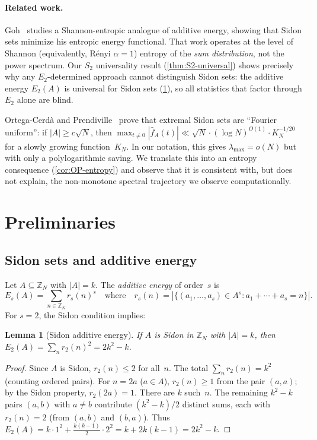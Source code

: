 \documentclass[11pt]{article}
\newtheorem{lemma}[theorem]{Lemma}
\theoremstyle{definition}
\theoremstyle{remark}
\newcommand{\Z}{\mathbb{Z}}
\newcommand{\fhat}{\widehat{f}}
\newcommand{\lmax}{\lambda_{\max}}
\begin{document}
\paragraph{Related work.}
Goh~\cite{Goh2024} studies a Shannon-entropic analogue of additive
energy, showing that Sidon sets minimize his entropic energy functional.
That work operates at the level of Shannon (equivalently, R\'enyi
$\alpha = 1$) entropy of the \emph{sum distribution}, not the power
spectrum.  Our $S_2$ universality result (\cref{thm:S2-universal})
shows precisely why any $E_2$-determined approach cannot distinguish
Sidon sets: the additive energy $E_2(A)$ is universal for Sidon sets
(\cref{lem:sidon-energy}), so all statistics that factor through
$E_2$ alone are blind.

Ortega-Cerd\`a and Prendiville~\cite{OP2021} prove that extremal Sidon
sets are ``Fourier uniform'': if $|A| \ge c\sqrt{N}$, then
$\max_{t \ne 0} |\fhat_A(t)| \ll
\sqrt{N} \cdot (\log N)^{O(1)} \cdot K_N^{-1/20}$
for a slowly growing function~$K_N$.  In our notation, this gives
$\lmax = o(N)$ but with only a polylogarithmic saving.  We translate
this into an entropy consequence (\cref{cor:OP-entropy}) and observe
that it is consistent with, but does not explain, the non-monotone
spectral trajectory we observe computationally.

\section{Preliminaries}\label{sec:prelim}

\subsection{Sidon sets and additive energy}

Let $A \subseteq \Z_N$ with $|A| = k$.  The \emph{additive energy}
of order~$s$ is
\[
  E_s(A) = \sum_{n \in \Z_N} r_s(n)^s
  \quad\text{where}\quad
  r_s(n) = |\{(a_1,\ldots,a_s) \in A^s : a_1 + \cdots + a_s = n\}|.
\]
For $s = 2$, the Sidon condition implies:

\begin{lemma}[Sidon additive energy]\label{lem:sidon-energy}
If $A$ is Sidon in $\Z_N$ with $|A| = k$, then
$E_2(A) = \sum_n r_2(n)^2 = 2k^2 - k$.
\end{lemma}

\begin{proof}
Since $A$ is Sidon, $r_2(n) \le 2$ for all~$n$.
The total $\sum_n r_2(n) = k^2$ (counting ordered pairs).
For $n = 2a$ ($a \in A$), $r_2(n) \ge 1$ from the pair $(a,a)$;
by the Sidon property, $r_2(2a) = 1$.  There are $k$ such~$n$.
The remaining $k^2 - k$ pairs $(a,b)$ with $a \ne b$ contribute
$(k^2-k)/2$ distinct sums, each with $r_2(n) = 2$ (from $(a,b)$
and $(b,a)$).
Thus $E_2(A) = k \cdot 1^2 + \tfrac{k(k-1)}{2} \cdot 2^2
= k + 2k(k-1) = 2k^2 - k$.
\end{proof}
\end{document}
